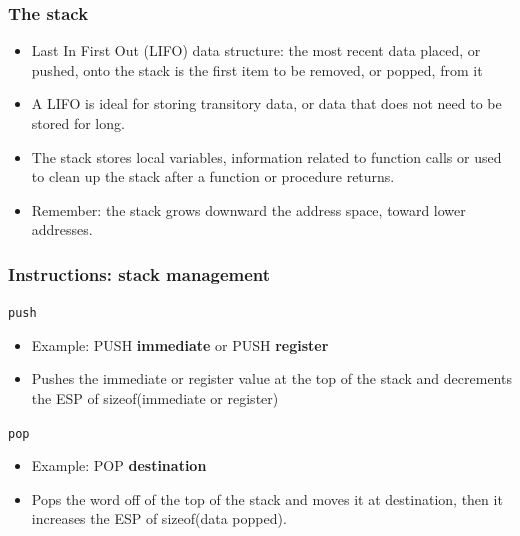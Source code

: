 \documentclass[]{beamer}
\begin{document}
\begin{frame}
  \frametitle{The stack}
  \begin{itemize}
  \item{Last In First Out (LIFO) data structure: the most recent data placed, or pushed, onto the stack is the first item to be removed, or popped, from it}
  \item{A LIFO is ideal for storing transitory data, or data that does not need to be stored for long.}
  \item{The stack stores local variables, information related to function calls or used to clean up the stack after a function or procedure returns.}
  \item{Remember: the stack grows downward the address space, toward lower addresses.}
  \end{itemize}
\end{frame}
\begin{frame}
  \frametitle{Instructions: stack management}
  \begin{block}{{\tt push}}
  \begin{itemize}
    \item{Example: PUSH {\bf immediate} or PUSH {\bf register} }
    \item{Pushes the immediate or register value at the top of the stack and decrements the ESP of sizeof(immediate or register)}
  \end{itemize}
  \end{block}
  \begin{block}{{\tt pop}}
  \begin{itemize}
    \item{Example: POP {\bf destination} }
    \item{Pops the word off of the top of the stack and moves it at destination, then it increases the ESP of sizeof(data popped).}
  \end{itemize}
  \end{block}
\end{frame}
\end{document}
